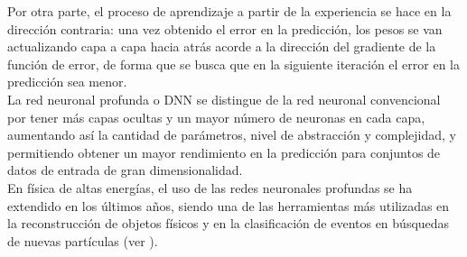 Por otra parte, el proceso de aprendizaje a partir de la experiencia se hace en la direcci\'on contraria: una vez obtenido el error en la predicci\'on, los pesos se van actualizando capa a capa hacia atr\'as acorde a la direcci\'on del gradiente de la funci\'on de error, de forma que se busca que en la siguiente iteraci\'on el error en la predicci\'on sea menor. \\

La red neuronal profunda o DNN se distingue de la red neuronal convencional por tener m\'as capas ocultas y un mayor n\'umero de neuronas en cada capa, aumentando as\'i la cantidad de par\'ametros, nivel de abstracci\'on y complejidad, y permitiendo obtener un mayor rendimiento en la predicci\'on para conjuntos de datos de entrada de gran dimensionalidad. \\

En f\'isica de altas energ\'ias, el uso de las redes neuronales profundas se ha extendido en los \'ultimos a\~nos, siendo una de las herramientas m\'as utilizadas en la reconstrucci\'on de objetos f\'isicos y en la clasificaci\'on de eventos en b\'usquedas de nuevas part\'iculas (ver \cite{collaboration2020IdentificationOH}). 
